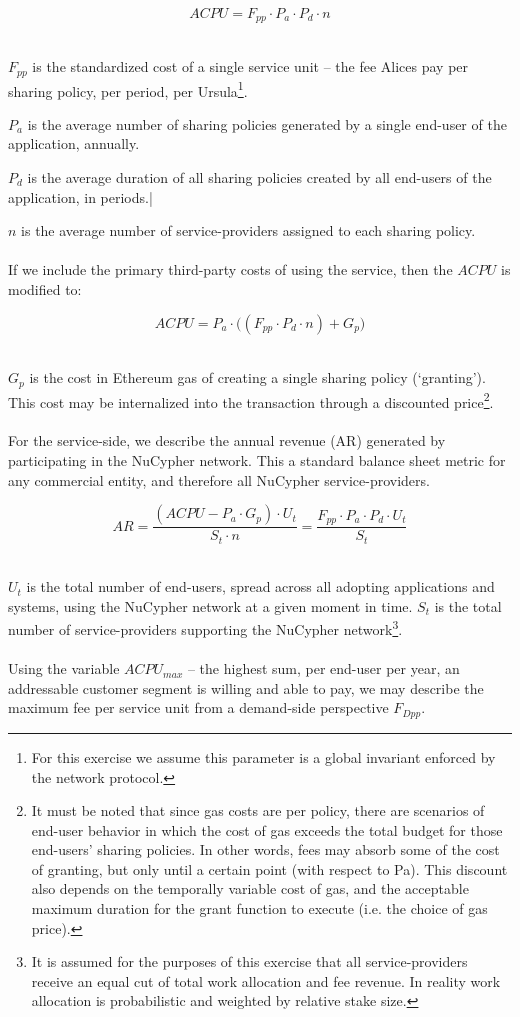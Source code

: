 \documentclass[longbibliography,nofootinbib]{revtex4-1}
\begin{document}
\begin{equation}
    ACPU = F_{pp} \cdot P_a \cdot P_d \cdot n  
\end{equation} \

$F_{pp}$ is the standardized cost of a single service unit – the fee Alices pay per sharing policy, per period, per Ursula\footnote{For this exercise we assume this parameter is a global invariant enforced by the network protocol.}.

$P_a$ is the average number of sharing policies generated by a single end-user of the application, annually.

$P_d$ is the average duration of all sharing policies created by all end-users of the application, in periods.|

$n$ is the average number of service-providers assigned to each sharing policy.
\\\\
If we include the primary third-party costs of using the service, then the $ACPU$ is modified to: 

\begin{equation}
    ACPU =  P_a \cdot \big((F_{pp} \cdot P_d \cdot n) + G_p\big)
\end{equation} \

$G_p$ is the cost in Ethereum gas of creating a single sharing policy (`granting'). This cost may be internalized into the transaction through a discounted price\footnote{It must be noted that since gas costs are per policy, there are scenarios of end-user behavior in which the cost of gas exceeds the total budget for those end-users' sharing policies. In other words, fees may absorb some of the cost of granting, but only until a certain point (with respect to Pa). This discount also depends on the temporally variable cost of gas, and the acceptable maximum duration for the grant function to execute (i.e. the choice of gas price).}.
\\\\
For the service-side, we describe the annual revenue (AR) generated by participating in the NuCypher network. This a standard balance sheet metric for any commercial entity, and therefore all NuCypher service-providers. 

\begin{equation}
    AR = \frac{(ACPU - P_a \cdot G_p ) \cdot U_t}{S_t \cdot n} =  \frac{F_{pp} \cdot P_a \cdot P_d \cdot U_t}{S_t}
\end{equation} \
    
$U_t$ is the total number of end-users, spread across all adopting applications and systems, using the NuCypher network at a given moment in time. 
$S_t$ is the total number of service-providers supporting the NuCypher network\footnote{It is assumed for the purposes of this exercise that all service-providers receive an equal cut of total work allocation and fee revenue. In reality work allocation is probabilistic and weighted by relative stake size.}.
\\\\
Using the variable $ACPU_{max}$ – the highest sum, per end-user per year, an addressable customer segment is willing and able to pay, we may describe the maximum fee per service unit from a demand-side perspective $F_{Dpp}$. 
\end{document}
